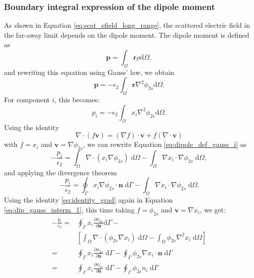 \subsubsection{Boundary integral expression of the dipole moment}

As shown in Equation \eqref{eq:scat_efield_long_range}, the scattered electric 
field in the far-away limit depends on the dipole moment. The dipole moment is 
defined as 
%
\begin{equation} \label{eq:dipole_def}
\mathbf{p} = \int_\Omega \mathbf{r} \rho \text{d}\Omega,
\end{equation}
%
and rewriting this equation using Gauss' law, we obtain
%
\begin{equation} \label{eq:dipole_def_gauss}
\mathbf{p} = -\epsilon_2\int_\Omega \mathbf{r} \nabla^2 \phi_{2s} \text{d}\Omega.
\end{equation}
%
For component $i$, this becomes:
%
\begin{equation} \label{eq:dipole_def_gauss_i}
{p_i} = -\epsilon_2\int_\Omega {x_i} \nabla^2 \phi_{2s} \text{d}\Omega.
\end{equation}
%
Using the identity
%
\begin{equation} \label{eq:identity_grad}
  \nabla \cdot \left(f \mathbf{v}\right) = \left( \nabla f \right)\cdot \mathbf{v} + f\left(\nabla \cdot \mathbf{v}\right)
\end{equation}
%
with $f=x_i$ and $\mathbf{v} = \nabla\phi_{2s}$, we can rewrite Equation \eqref{eq:dipole_def_gauss_i}
as 
%
\begin{equation}
- \frac{p_i}{\epsilon_2} = \int_\Omega \nabla \cdot \left( x_i \nabla \phi_{2s} \right) \; \text{d}\Omega - \int_\Omega \nabla x_i \cdot \nabla\phi_{2s} \; \text{d}\Omega, \nonumber 
\end{equation}
 and applying the divergence theorem
\begin{equation} \label{eq:dip_gauss_interm_1}
- \frac{p_i}{\epsilon_2}= \oint_\Gamma  x_i  \nabla \phi_{2s} \cdot \mathbf{n} \; \text{d}\Gamma - \int_\Omega \nabla x_i \cdot \nabla\phi_{2s} \; \text{d}\Omega.
\end{equation}
%
Using the identity \eqref{eq:identity_grad} again in Equation \eqref{eq:dip_gauss_interm_1}, this time 
taking $f=\phi_{2s}$ and $\mathbf{v} = \nabla x_i$, we get:
%
\begin{align} \label{eq:dip_gauss_interm_2}
 - \frac{p_i}{\epsilon_2} =& \oint_\Gamma  x_i  \frac{\partial \phi_{2s}}{\partial \mathbf{n}} \text{d}\Gamma - \nonumber \\
 & \left[ \int_\Omega \nabla \cdot \left( \phi_{2s} \nabla x_i \right)\;\text{d}\Omega - \int_\Omega  \phi_{2s} \nabla^2 x_i \;\text{d}\Omega\right] \nonumber\\
=& \oint_\Gamma  x_i  \frac{\partial \phi_{2s}}{\partial \mathbf{n}} \; \text{d}\Gamma - \oint_\Gamma \phi_{2s} \nabla x_i \cdot \mathbf{n} \; \text{d}\Gamma \nonumber \\
=& \oint_\Gamma  x_i  \frac{\partial \phi_{2s}}{\partial \mathbf{n}} \; \text{d}\Gamma - \oint_\Gamma \phi_{2s} n_i \;\text{d}\Gamma
\end{align}
